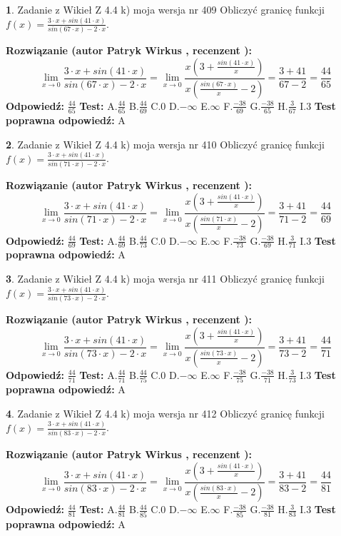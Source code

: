 \documentclass[12pt, a4paper]{article}
\theoremstyle{definition} %
\newtheorem{zad}{}
\newcommand{\zadStart}[1]{\begin{zad}#1\newline}
\newcommand{\zadStop}{\end{zad}}
\newcommand{\rozwStart}[2]{\noindent \textbf{Rozwiązanie (autor #1 , recenzent #2): }\newline}
\newcommand{\rozwStop}{\newline}
\newcommand{\odpStart}{\noindent \textbf{Odpowiedź:}\newline}
\newcommand{\odpStop}{\newline}
\newcommand{\testStart}{\noindent \textbf{Test:}\newline}
\newcommand{\testStop}{\newline}
\newcommand{\kluczStart}{\noindent \textbf{Test poprawna odpowiedź:}\newline}
\newcommand{\kluczStop}{\newline}
\begin{document}
\zadStart{Zadanie z Wikieł Z 4.4 k) moja wersja nr 409}
Obliczyć granicę funkcji $f(x)=\frac{3\cdot x +sin(41\cdot x)}{sin(67\cdot x) -2\cdot x}$.
\zadStop
\rozwStart{Patryk Wirkus}{}
$$\lim\limits_{x\to 0}\frac{3\cdot x +sin(41\cdot x)}{sin(67\cdot x) -2\cdot x}
=\lim\limits_{x\to 0}\frac{x(3+\frac{sin(41\cdot x)}{x})}{x(\frac{sin(67\cdot x)}{x}-2)}
=\frac{3+41}{67-2} = \frac{44}{65}$$
\rozwStop
\odpStart
$\frac{44}{65}$
\odpStop
\testStart
A.$\frac{44}{65}$
B.$\frac{44}{69}$
C.$0$
D.$-\infty$
E.$\infty$
F.$\frac{-38}{69}$
G.$\frac{-38}{65}$
H.$\frac{3}{67}$
I.$3$
\testStop
\kluczStart
A
\kluczStop



\zadStart{Zadanie z Wikieł Z 4.4 k) moja wersja nr 410}
Obliczyć granicę funkcji $f(x)=\frac{3\cdot x +sin(41\cdot x)}{sin(71\cdot x) -2\cdot x}$.
\zadStop
\rozwStart{Patryk Wirkus}{}
$$\lim\limits_{x\to 0}\frac{3\cdot x +sin(41\cdot x)}{sin(71\cdot x) -2\cdot x}
=\lim\limits_{x\to 0}\frac{x(3+\frac{sin(41\cdot x)}{x})}{x(\frac{sin(71\cdot x)}{x}-2)}
=\frac{3+41}{71-2} = \frac{44}{69}$$
\rozwStop
\odpStart
$\frac{44}{69}$
\odpStop
\testStart
A.$\frac{44}{69}$
B.$\frac{44}{73}$
C.$0$
D.$-\infty$
E.$\infty$
F.$\frac{-38}{73}$
G.$\frac{-38}{69}$
H.$\frac{3}{71}$
I.$3$
\testStop
\kluczStart
A
\kluczStop



\zadStart{Zadanie z Wikieł Z 4.4 k) moja wersja nr 411}
Obliczyć granicę funkcji $f(x)=\frac{3\cdot x +sin(41\cdot x)}{sin(73\cdot x) -2\cdot x}$.
\zadStop
\rozwStart{Patryk Wirkus}{}
$$\lim\limits_{x\to 0}\frac{3\cdot x +sin(41\cdot x)}{sin(73\cdot x) -2\cdot x}
=\lim\limits_{x\to 0}\frac{x(3+\frac{sin(41\cdot x)}{x})}{x(\frac{sin(73\cdot x)}{x}-2)}
=\frac{3+41}{73-2} = \frac{44}{71}$$
\rozwStop
\odpStart
$\frac{44}{71}$
\odpStop
\testStart
A.$\frac{44}{71}$
B.$\frac{44}{75}$
C.$0$
D.$-\infty$
E.$\infty$
F.$\frac{-38}{75}$
G.$\frac{-38}{71}$
H.$\frac{3}{73}$
I.$3$
\testStop
\kluczStart
A
\kluczStop



\zadStart{Zadanie z Wikieł Z 4.4 k) moja wersja nr 412}
Obliczyć granicę funkcji $f(x)=\frac{3\cdot x +sin(41\cdot x)}{sin(83\cdot x) -2\cdot x}$.
\zadStop
\rozwStart{Patryk Wirkus}{}
$$\lim\limits_{x\to 0}\frac{3\cdot x +sin(41\cdot x)}{sin(83\cdot x) -2\cdot x}
=\lim\limits_{x\to 0}\frac{x(3+\frac{sin(41\cdot x)}{x})}{x(\frac{sin(83\cdot x)}{x}-2)}
=\frac{3+41}{83-2} = \frac{44}{81}$$
\rozwStop
\odpStart
$\frac{44}{81}$
\odpStop
\testStart
A.$\frac{44}{81}$
B.$\frac{44}{85}$
C.$0$
D.$-\infty$
E.$\infty$
F.$\frac{-38}{85}$
G.$\frac{-38}{81}$
H.$\frac{3}{83}$
I.$3$
\testStop
\kluczStart
A
\kluczStop
\end{document}
